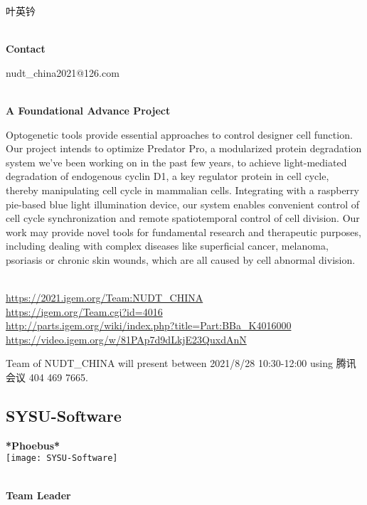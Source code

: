   叶英钤


\textbf{\\Contact}

  nudt\_china2021@126.com


\textbf{\\A Foundational Advance Project\\}\begin{spacing}{1.5}

Optogenetic tools provide essential approaches to control designer cell function. Our project intends to optimize Predator Pro, a modularized protein degradation system we’ve been working on in the past few years, to achieve light-mediated degradation of endogenous cyclin D1, a key regulator protein in cell cycle, thereby manipulating cell cycle in mammalian cells. Integrating with a raspberry pie-based blue light illumination device, our system enables convenient control of cell cycle synchronization and remote spatiotemporal control of cell division. Our work may provide novel tools for fundamental research and therapeutic purposes, including dealing with complex diseases like superficial cancer, melanoma, psoriasis or chronic skin wounds, which are all caused by cell abnormal division.\end{spacing}
\\

\url{https://2021.igem.org/Team:NUDT\_CHINA }\\
\url{https://igem.org/Team.cgi?id=4016 }\\
\url{http://parts.igem.org/wiki/index.php?title=Part:BBa_K4016000 }\\
\url{https://video.igem.org/w/81PAp7d9dLkjE23QuxdAnN }\\

\vfill{}









Team of NUDT\_CHINA will present between     2021/8/28 10:30-12:00    using 腾讯会议 404 469 7665.
\newpage


\subsection{\textcolor{Blu}{ SYSU-Software } }
\vspace{5mm}
\begin{center}
\large{
  \textbf{ *Phoebus* }\\

  \texttt{[image: SYSU-Software]}
}
\end{center}
\textbf{\\Team Leader}

